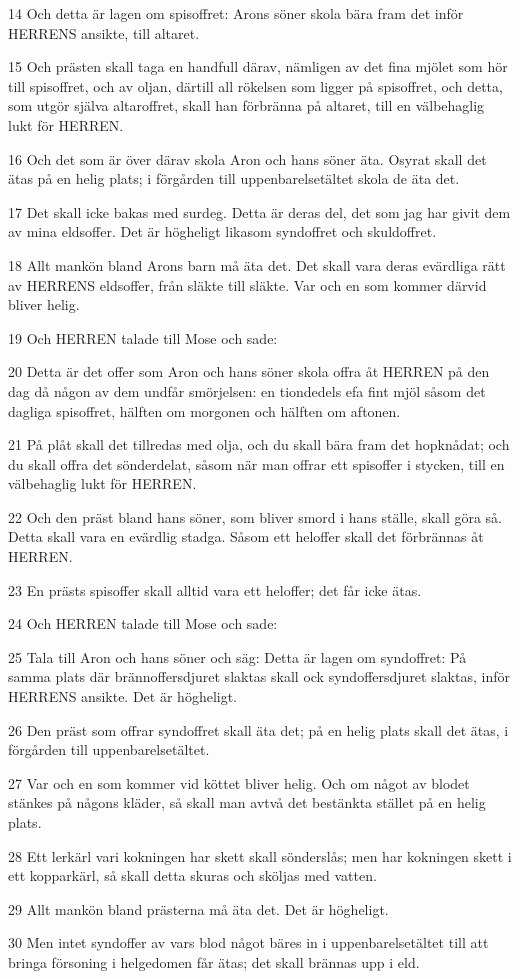 \par 14 Och detta är lagen om spisoffret: Arons söner skola bära fram det inför HERRENS ansikte, till altaret.
\par 15 Och prästen skall taga en handfull därav, nämligen av det fina mjölet som hör till spisoffret, och av oljan, därtill all rökelsen som ligger på spisoffret, och detta, som utgör själva altaroffret, skall han förbränna på altaret, till en välbehaglig lukt för HERREN.
\par 16 Och det som är över därav skola Aron och hans söner äta. Osyrat skall det ätas på en helig plats; i förgården till uppenbarelsetältet skola de äta det.
\par 17 Det skall icke bakas med surdeg. Detta är deras del, det som jag har givit dem av mina eldsoffer. Det är högheligt likasom syndoffret och skuldoffret.
\par 18 Allt mankön bland Arons barn må äta det. Det skall vara deras evärdliga rätt av HERRENS eldsoffer, från släkte till släkte. Var och en som kommer därvid bliver helig.
\par 19 Och HERREN talade till Mose och sade:
\par 20 Detta är det offer som Aron och hans söner skola offra åt HERREN på den dag då någon av dem undfår smörjelsen: en tiondedels efa fint mjöl såsom det dagliga spisoffret, hälften om morgonen och hälften om aftonen.
\par 21 På plåt skall det tillredas med olja, och du skall bära fram det hopknådat; och du skall offra det sönderdelat, såsom när man offrar ett spisoffer i stycken, till en välbehaglig lukt för HERREN.
\par 22 Och den präst bland hans söner, som bliver smord i hans ställe, skall göra så. Detta skall vara en evärdlig stadga. Såsom ett heloffer skall det förbrännas åt HERREN.
\par 23 En prästs spisoffer skall alltid vara ett heloffer; det får icke ätas.
\par 24 Och HERREN talade till Mose och sade:
\par 25 Tala till Aron och hans söner och säg: Detta är lagen om syndoffret: På samma plats där brännoffersdjuret slaktas skall ock syndoffersdjuret slaktas, inför HERRENS ansikte. Det är högheligt.
\par 26 Den präst som offrar syndoffret skall äta det; på en helig plats skall det ätas, i förgården till uppenbarelsetältet.
\par 27 Var och en som kommer vid köttet bliver helig. Och om något av blodet stänkes på någons kläder, så skall man avtvå det bestänkta stället på en helig plats.
\par 28 Ett lerkärl vari kokningen har skett skall sönderslås; men har kokningen skett i ett kopparkärl, så skall detta skuras och sköljas med vatten.
\par 29 Allt mankön bland prästerna må äta det. Det är högheligt.
\par 30 Men intet syndoffer av vars blod något bäres in i uppenbarelsetältet till att bringa försoning i helgedomen får ätas; det skall brännas upp i eld.


